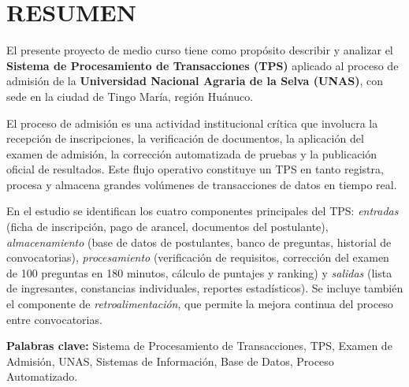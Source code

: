 \documentclass[12pt, a4paper]{report}
\begin{document}
\section*{RESUMEN}

El presente proyecto de medio curso tiene como propósito describir y analizar el \textbf{Sistema de Procesamiento de Transacciones (TPS)} aplicado al proceso de admisión de la \textbf{Universidad Nacional Agraria de la Selva (UNAS)}, con sede en la ciudad de Tingo María, región Huánuco.

El proceso de admisión es una actividad institucional crítica que involucra la recepción de inscripciones, la verificación de documentos, la aplicación del examen de admisión, la corrección automatizada de pruebas y la publicación oficial de resultados. Este flujo operativo constituye un TPS en tanto registra, procesa y almacena grandes volúmenes de transacciones de datos en tiempo real.

En el estudio se identifican los cuatro componentes principales del TPS: \textit{entradas} (ficha de inscripción, pago de arancel, documentos del postulante), \textit{almacenamiento} (base de datos de postulantes, banco de preguntas, historial de convocatorias), \textit{procesamiento} (verificación de requisitos, corrección del examen de 100 preguntas en 180 minutos, cálculo de puntajes y ranking) y \textit{salidas} (lista de ingresantes, constancias individuales, reportes estadísticos). Se incluye también el componente de \textit{retroalimentación}, que permite la mejora continua del proceso entre convocatorias.

\bigskip
\noindent\textbf{Palabras clave:} Sistema de Procesamiento de Transacciones, TPS, Examen de Admisión, UNAS, Sistemas de Información, Base de Datos, Proceso Automatizado.
\clearpage
\tableofcontents
\newpage

\listoffigures     %
\clearpage

\listoftables      %
\clearpage

\end{document}
